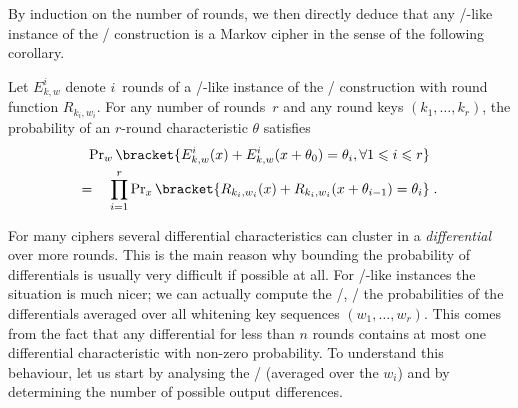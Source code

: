 By induction on the number of rounds, we then directly deduce that any \bison/-like instance of the \WSN/ construction is a Markov cipher in the sense of the following corollary.
\begin{corollary}\label{bison:coro:Markov}
    Let $E_{k,w}^i$ denote $i$~rounds of a \bison/-like instance of the \WSN/ construction with round function $R_{k_i,w_i}$.
    For any number of rounds~$r$ and any round keys $(k_1, \ldots, k_r)$, the probability of an $r$-round characteristic $\theta$ satisfies
    \begin{gather*}
            \Prob_{w}\bracket{E^i_{k,w}(x) + E^i_{k,w}(x+\theta_0)=\theta_i, \forall 1 \leqslant i \leqslant r} \\
            = \quad \prod_{i=1}^r \Prob_{x} \bracket{R_{k_i,w_i}(x) + R_{k_i,w_i}(x+\theta_{i-1}) = \theta_i}\;.
    \end{gather*}
\end{corollary}

For many ciphers several differential characteristics can cluster in a \emph{differential} over more rounds.
This is the main reason why bounding the probability of differentials is usually very difficult if possible at all.
For \bison/-like instances the situation is much nicer; we can actually compute the \EDP/, \ie/ the probabilities of the differentials averaged over all whitening key sequences $(w_1, \ldots, w_r)$.
This comes from the fact that any differential for less than $n$ rounds contains at most one differential characteristic with non-zero probability.
To understand this behaviour, let us start by analysing the \EDP/ (averaged over the $w_i$) and by determining the number of possible output differences.

